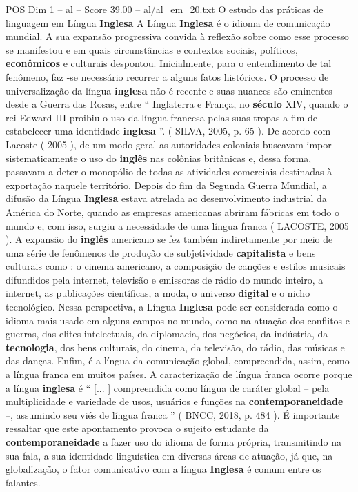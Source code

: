 \begin{textsample}{POS Dim 1 – al – Score 39.00 – al/al\_em\_20.txt}  \label{ex:f1_pos_158}
O estudo das práticas de linguagem em Língua \textbf{Inglesa} A Língua \textbf{Inglesa} é o idioma de comunicação mundial.
A sua expansão progressiva convida à reflexão sobre como esse processo se manifestou e em quais circunstâncias e contextos sociais, políticos, \textbf{econômicos} e culturais despontou.
Inicialmente, para o entendimento de tal fenômeno, faz -se necessário recorrer a alguns fatos históricos.
O processo de universalização da língua \textbf{inglesa} não é recente e suas nuances são eminentes desde a Guerra das Rosas, entre “ Inglaterra e França, no \textbf{século} XIV, quando o rei Edward III proibiu o uso da língua francesa pelas suas tropas a fim de estabelecer uma identidade \textbf{inglesa} ”. ( SILVA, 2005, p. 65 ).
De acordo com Lacoste ( 2005 ), de um modo geral as autoridades coloniais buscavam impor sistematicamente o uso do \textbf{inglês} nas colônias britânicas e, dessa forma, passavam a deter o monopólio de todas as atividades comerciais destinadas à exportação naquele território.
Depois do fim da Segunda Guerra Mundial, a difusão da Língua \textbf{Inglesa} estava atrelada ao desenvolvimento industrial da América do Norte, quando as empresas americanas abriram fábricas em todo o mundo e, com isso, surgiu a necessidade de uma língua franca ( LACOSTE, 2005 ).
A expansão do \textbf{inglês} americano se fez também indiretamente por meio de uma série de fenômenos de produção de subjetividade \textbf{capitalista} e bens culturais como : o cinema americano, a composição de canções e estilos musicais difundidos pela internet, televisão e emissoras de rádio do mundo inteiro, a internet, as publicações científicas, a moda, o universo \textbf{digital} e o nicho tecnológico.
Nessa perspectiva, a Língua \textbf{Inglesa} pode ser considerada como o idioma mais usado em alguns campos no mundo, como na atuação dos conflitos e guerras, das elites intelectuais, da diplomacia, dos negócios, da indústria, da \textbf{tecnologia}, dos bens culturais, do cinema, da televisão, do rádio, das músicas e das danças.
Enfim, é a língua da comunicação global, compreendida, assim, como a língua franca em muitos países.
A caracterização de língua franca ocorre porque a língua \textbf{inglesa} é “ [... ] compreendida como língua de caráter global – pela multiplicidade e variedade de usos, usuários e funções na \textbf{contemporaneidade} –, assumindo seu viés de língua franca ” ( BNCC, 2018, p. 484 ).
É importante ressaltar que este apontamento provoca o sujeito estudante da \textbf{contemporaneidade} a fazer uso do idioma de forma própria, transmitindo na sua fala, a sua identidade linguística em diversas áreas de atuação, já que, na globalização, o fator comunicativo com a língua \textbf{Inglesa} é comum entre os falantes.

\end{textsample}
